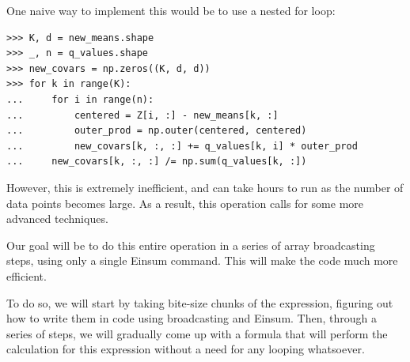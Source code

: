 One naive way to implement this would be to use a nested for loop:
\begin{lstlisting}
>>> K, d = new_means.shape
>>> _, n = q_values.shape
>>> new_covars = np.zeros((K, d, d))
>>> for k in range(K):
... 	for i in range(n):
...	        centered = Z[i, :] - new_means[k, :]
...	        outer_prod = np.outer(centered, centered)
...	        new_covars[k, :, :] += q_values[k, i] * outer_prod
...	    new_covars[k, :, :] /= np.sum(q_values[k, :])
\end{lstlisting}

However, this is extremely inefficient, and can take hours to run as the number of data points becomes large.
As a result, this operation calls for some more advanced techniques.

Our goal will be to do this entire operation in a series of array broadcasting steps, using only a single Einsum command.
This will make the code much more efficient.

To do so, we will start by taking bite-size chunks of the expression, figuring out how to write them in code using broadcasting and Einsum.
Then, through a series of steps, we will gradually come up with a formula that will perform the calculation for this expression without a need for any looping whatsoever.

